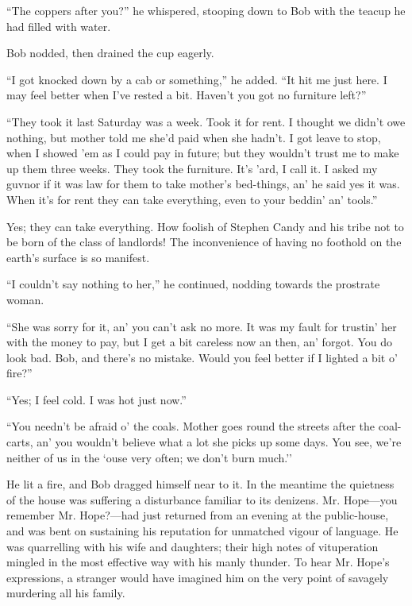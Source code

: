 ``The coppers after you?'' he whispered, stooping down to Bob with the
teacup he had filled with water.

Bob nodded, then drained the cup eagerly.

``I got knocked down by a cab or something,'' he added. ``It hit me just
here. I may feel better when I've rested a bit. Haven't you got no
furniture left?''

``They took it last Saturday was a week. Took it for rent. I thought we
didn't owe nothing, but mother told me she'd paid when she hadn't. I got
leave to stop, when I showed 'em as I could pay in future; but they
wouldn't trust me to make up them three weeks. They took the furniture.
It's 'ard, I call it. I asked my guvnor if it was law for them to take
mother's bed-things, an' he said yes it was. When it's for rent they can
take everything, even to your beddin' an' tools.''

Yes; they can take everything. How foolish of Stephen Candy and his
tribe not to be born of the class of landlords! The inconvenience of
having no foothold on the earth's surface is so manifest.

{\protect\hypertarget{203}{}{}}``I couldn't say nothing to her,'' he
continued, nodding towards the prostrate woman.

``She was sorry for it, an' you can't ask no more. It was my fault for
trustin' her with the money to pay, but I get a bit careless now an
then, an' forgot. You do look bad. Bob, and there's no mistake. Would
you feel better if I lighted a bit o' fire?''

``Yes; I feel cold. I was hot just now.''

``You needn't be afraid o' the coals. Mother goes round the streets
after the coal-carts, an' you wouldn't believe what a lot she picks up
some days. You see, we're neither of us in the `ouse very often; we
don't burn much.''

He lit a fire, and Bob dragged himself near to it. In the meantime the
quietness of the house was suffering a disturbance familiar to its
denizens. Mr. Hope---you remember Mr. Hope?---had just returned from an
evening at the public-house, and was bent on sustaining his reputation
for unmatched vigour of language. He was quarrelling with his wife and
daughters; their high notes of vituperation mingled in the most
effective way with his manly thunder. To hear Mr. Hope's expressions, a
stranger would have imagined him on {\protect\hypertarget{204}{}{}}the
very point of savagely murdering all his family.

